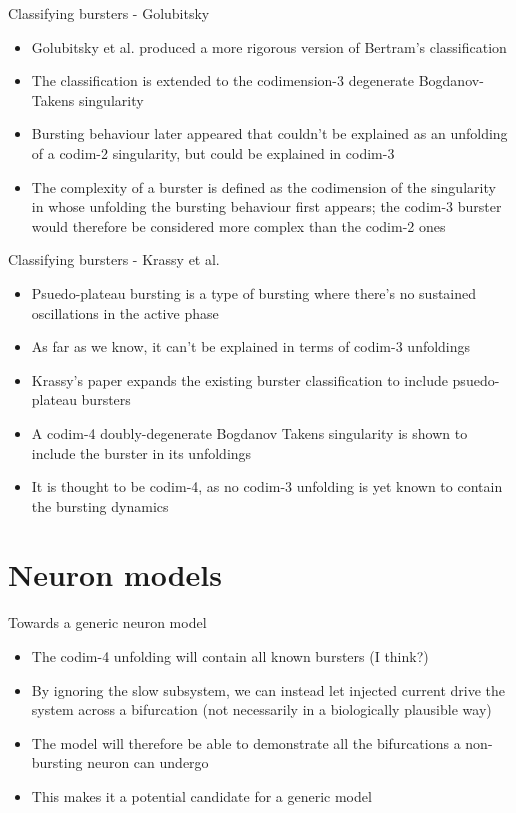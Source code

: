 \documentclass[,aspectratio=169]{beamer}
\begin{document}
\begin{frame}[label={sec:orgb259a09}]{Classifying bursters - Golubitsky}
\begin{itemize}
\item Golubitsky et al. produced a more rigorous version of Bertram's classification
\item The classification is extended to the codimension-3 degenerate Bogdanov-Takens singularity
\item Bursting behaviour later appeared that couldn't be explained as an unfolding of a codim-2 singularity, but could be explained in codim-3
\item The complexity of a burster is defined as the codimension of the singularity in whose unfolding the bursting behaviour first appears; the codim-3 burster would therefore be considered more complex than the codim-2 ones
\end{itemize}
\end{frame}

\begin{frame}[label={sec:orgb265bd5}]{Classifying bursters - Krassy et al.}
\begin{itemize}
\item Psuedo-plateau bursting is a type of bursting where there's no sustained oscillations in the active phase
\item As far as we know, it can't be explained in terms of codim-3 unfoldings
\item Krassy's paper expands the existing burster classification to include psuedo-plateau bursters
\item A codim-4 doubly-degenerate Bogdanov Takens singularity is shown to include the burster in its unfoldings
\item It is thought to be codim-4, as no codim-3 unfolding is yet known to contain the bursting dynamics
\end{itemize}
\end{frame}

\section{Neuron models}
\label{sec:orgd1b1c93}
\begin{frame}[label={sec:org62de8e6}]{Towards a generic neuron model}
\begin{itemize}
\item The codim-4 unfolding will contain all known bursters (I think?)
\item By ignoring the slow subsystem, we can instead let injected current drive the system across a bifurcation (not necessarily in a biologically plausible way)
\item The model will therefore be able to demonstrate all the bifurcations a non-bursting neuron can undergo
\item This makes it a potential candidate for a generic model
\end{itemize}
\end{frame}
\end{document}
